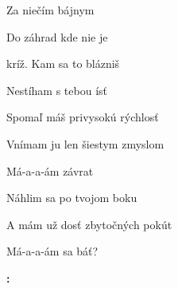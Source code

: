 \begin{song}
\bigskip

 Za niečím bájnym \par
{} Do záhrad kde nie je \par
{}kríž. Kam sa to blázniš \par
Nestíham s tebou ísť \par

\bigskip

Spomaľ máš privysokú rýchlosť \par
{}Vnímam ju len šiestym zmyslom \par
{}Má-a-a-ám závrat  \par

\bigskip

Náhlim sa po tvojom boku \par
A mám už dosť zbytočných pokút \par
{}Má-a-a-ám sa báť?  \par

\bigskip

\Outro\textbf{:} \par
{}    \par
{}    \par

\end{song}
